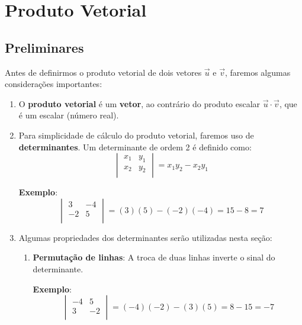 \section{Produto Vetorial}
 
\subsection{Preliminares}

Antes de definirmos o produto vetorial de dois vetores $\vec{u}$ e $\vec{v}$,
faremos algumas considerações importantes:

\begin{enumerate}[label=\alph*)]
    \item O \textbf{produto vetorial} é um \textbf{vetor}, ao contrário do
      produto escalar $\vec{u} \cdot \vec{v}$, que é um escalar (número real).
    
    \item Para simplicidade de cálculo do produto vetorial, faremos uso de
      \textbf{determinantes}. Um determinante de ordem 2 é definido como:
    \[
      \begin{vmatrix}
        x_1 & y_1 \\
        x_2 & y_2 \\
      \end{vmatrix}
      = x_1y_2 - x_2y_1
    \]
    
    \textbf{Exemplo}:
    \[
      \begin{vmatrix}
        3 & -4 \\
        -2 & 5 \\
      \end{vmatrix}
      = (3)(5) - (-2)(-4) = 15 - 8 = 7
    \]
    
    \item Algumas propriedades dos determinantes serão utilizadas nesta seção:
    \begin{enumerate}[label=\alph{enumi}.\arabic*)]
        \item \textbf{Permutação de linhas}: A troca de duas linhas inverte o
          sinal do determinante.
        
        \textbf{Exemplo}:
        \[
          \begin{vmatrix}
            -4 & 5 \\
            3 & -2 \\
          \end{vmatrix}
          = (-4)(-2) - (3)(5) = 8 - 15 = -7
        \]
        

\end{enumerate}
\end{enumerate}
